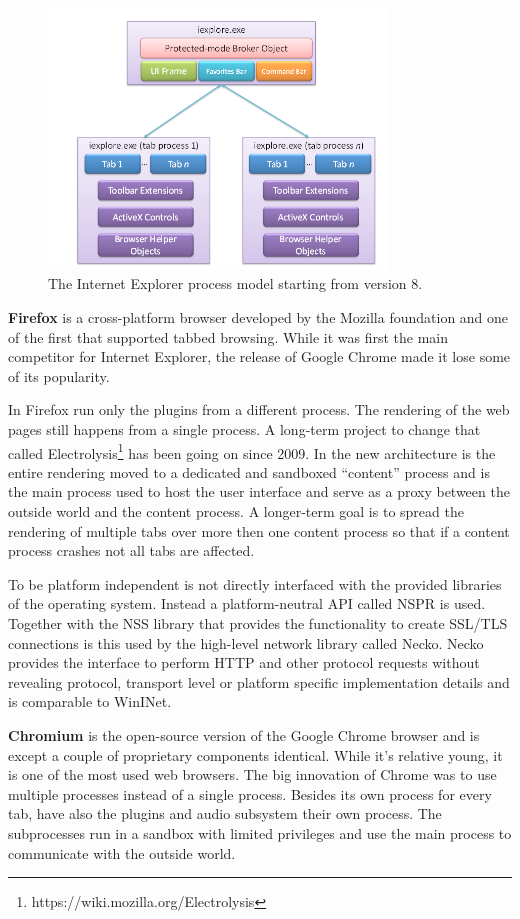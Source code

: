 \begin{figure}
    \centering
    \includegraphics[width=9cm]{Images/IE8_process_model.png}
    \caption{The Internet Explorer process model starting from version 8. \cite{zelfde msdn link, modified}}
    \label{fig:ie8proc}
\end{figure}

\textbf{Firefox} is a cross-platform browser developed by the Mozilla foundation and one of the first that supported tabbed browsing. While it was first the main competitor for Internet Explorer, the release of Google Chrome made it lose some of its popularity.

In Firefox run only the plugins from a different process. The rendering of the web pages still happens from a single process. A long-term project to change that called Electrolysis\footnote{https://wiki.mozilla.org/Electrolysis} has been going on since 2009. In the new architecture is the entire rendering moved to a dedicated and sandboxed ``content'' process and is the main process used to host the user interface and serve as a proxy between the outside world and the content process. A longer-term goal is to spread the rendering of multiple tabs over more then one content process so that if a content process crashes not all tabs are affected.

To be platform independent is not directly interfaced with the provided libraries of the operating system. Instead a platform-neutral API called NSPR is used. Together with the NSS library that provides the functionality to create SSL/TLS connections is this used by the high-level network library called Necko. Necko provides the interface to perform HTTP and other protocol requests without revealing protocol, transport level or platform specific implementation details and is comparable to WinINet.

\textbf{Chromium} is the open-source version of the Google Chrome browser and is except a couple of proprietary components identical. While it's relative young, it is one of the most used web browsers. The big innovation of Chrome \cite{http://blog.chromium.org/2008/09/multi-process-architecture.html} was to use multiple processes instead of a single process. Besides its own process for every tab, have also the plugins and audio subsystem their own process. The subprocesses run in a sandbox with limited privileges and use the main process to communicate with the outside world.

